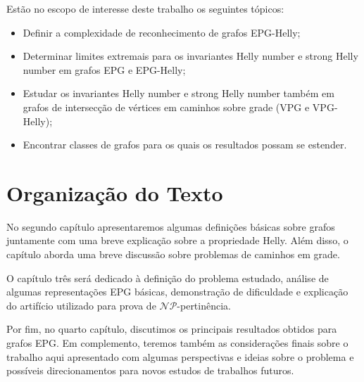 Estão no escopo de interesse deste trabalho os seguintes tópicos:

\begin{itemize}
    
    \item Definir a complexidade de reconhecimento de grafos EPG-Helly;
    \item Determinar limites extremais para os invariantes Helly number e strong Helly number em grafos EPG e EPG-Helly;
    
    \item Estudar os invariantes Helly number e strong Helly number também em grafos de intersecção de vértices em caminhos sobre grade (VPG e VPG-Helly);
    
    \item Encontrar classes de grafos para os quais os resultados possam se estender.
\end{itemize}









\section{Organização do Texto}

No segundo capítulo apresentaremos algumas definições básicas sobre grafos juntamente com uma breve explicação sobre a propriedade Helly. Além disso, o capítulo aborda uma breve discussão sobre problemas de caminhos em grade.

O capítulo três será dedicado à definição do problema estudado, análise de algumas representações EPG básicas, demonstração de dificuldade e explicação do artifício utilizado para prova de $\mathcal{NP}$-pertinência.

Por fim, no quarto capítulo, discutimos os principais resultados obtidos para grafos EPG. Em complemento, teremos
também as considerações finais sobre o trabalho aqui apresentado com algumas perspectivas e ideias sobre o problema e possíveis direcionamentos para novos estudos de trabalhos futuros.